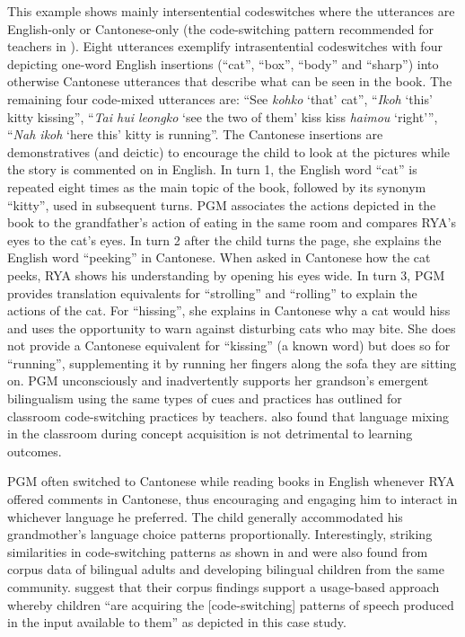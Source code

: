 \documentclass[output=paper,colorlinks,citecolor=brown]{langscibook}
\begin{document}
This example shows mainly intersentential codeswitches where the utterances are English-only or Cantonese-only (the code-switching pattern recommended for teachers in \citealt{Faltis2019}). Eight utterances exemplify intrasentential codeswitches with four depicting one-word English insertions (“cat”, “box”, “body” and “sharp”) into otherwise Cantonese utterances that describe what can be seen in the book. The remaining four code-mixed utterances are: “See \textit{kohko} ‘that’ cat”, “\textit{Ikoh} ‘this’ kitty kissing”, “\textit{Tai hui leongko} ‘see the two of them’ kiss kiss \textit{haimou} ‘right’”, “\textit{Nah ikoh} ‘here this’ kitty is running”. The Cantonese insertions are demonstratives (and deictic) to encourage the child to look at the pictures while the story is commented on in English. In turn 1, the English word “cat” is repeated eight times as the main topic of the book, followed by its synonym “kitty”, used in subsequent turns. PGM associates the actions depicted in the book to the grandfather’s action of eating in the same room and compares RYA’s eyes to the cat’s eyes. In turn 2 after the child turns the page, she explains the English word “peeking” in Cantonese. When asked in Cantonese how the cat peeks, RYA shows his understanding by opening his eyes wide. In turn 3, PGM provides translation equivalents for “strolling” and “rolling” to explain the actions of the cat. For “hissing”, she explains in Cantonese why a cat would hiss and uses the opportunity to warn against disturbing cats who may bite. She does not provide a Cantonese equivalent for “kissing” (a known word) but does so for “running”, supplementing it by running her fingers along the sofa they are sitting on. PGM unconsciously and inadvertently supports her grandson’s emergent bilingualism using the same types of cues and practices \citet{Faltis2019} has outlined for classroom code-switching practices by teachers. \citet{AntónEtAl2016} also found that language mixing in the classroom during concept acquisition is not detrimental to learning outcomes.

PGM often switched to Cantonese while reading books in English whenever RYA offered comments in Cantonese, thus encouraging and engaging him to interact in whichever language he preferred. The child generally accommodated his grandmother’s language choice patterns proportionally. Interestingly, striking similarities in code-switching patterns as shown in  and  were also found from corpus data of bilingual adults and developing bilingual children from the same community.  \citet[74]{PhillipsDeuchar2021} suggest that their corpus findings support a usage-based approach whereby children “are acquiring the [code-switching] patterns of speech produced in the input available to them” as depicted in this case study.
\end{document}

